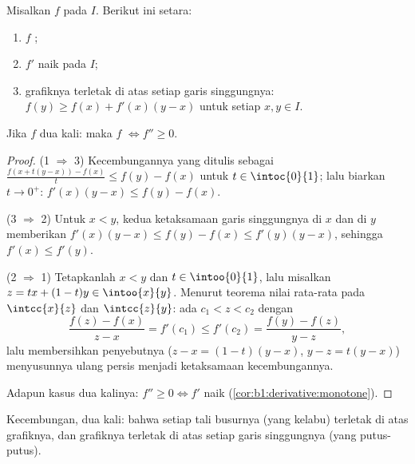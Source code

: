 \begin{theorem}\label{thm:b1:derivative:convexchar}
Misalkan $f$  pada $I$. Berikut ini setara:
\begin{enumerate}
  \item $f$ ;
  \item $f'$ naik pada $I$;
  \item grafiknya terletak di atas setiap garis singgungnya: $f(y) \geq f(x) +
        f'(x)(y - x)$ untuk setiap $x, y \in I$.
\end{enumerate}
Jika $f$  dua kali: maka $f$  $\iff f'' \geq 0$.
\end{theorem}

\begin{proof}
(1 $\Rightarrow$ 3) Kecembungannya yang ditulis sebagai $\frac{f(x + t(y-x)) -
f(x)}{t} \leq f(y) - f(x)$ untuk $t \in \intoc{0}{1}$; lalu biarkan $t \to 0^+$:
$f'(x)(y - x) \leq f(y) - f(x)$.

(3 $\Rightarrow$ 2) Untuk $x < y$, kedua ketaksamaan garis singgungnya di $x$
dan di $y$ memberikan $f'(x)(y-x) \leq f(y) - f(x) \leq f'(y)(y - x)$,
sehingga $f'(x) \leq f'(y)$.

(2 $\Rightarrow$ 1) Tetapkanlah $x < y$ dan $t \in \intoo{0}{1}$, lalu misalkan $z
= tx + (1-t)y \in \intoo{x}{y}$. Menurut teorema nilai rata-rata pada
$\intcc{x}{z}$ dan $\intcc{z}{y}$: ada $c_1 < z < c_2$ dengan
\[
\frac{f(z) - f(x)}{z - x} = f'(c_1) \leq f'(c_2)
= \frac{f(y) - f(z)}{y - z} ,
\]
lalu membersihkan penyebutnya ($z - x = (1-t)(y-x)$, $y - z = t(y-x)$)
menyusunnya ulang persis menjadi ketaksamaan kecembungannya.

Adapun kasus  dua kalinya: $f'' \geq 0 \iff f'$ naik
(\cref{cor:b1:derivative:monotone}).
\end{proof}

\begin{omfigure}

{\small Kecembungan, dua kali: bahwa setiap tali busurnya (yang kelabu) terletak di atas grafiknya,
dan grafiknya terletak di atas setiap garis singgungnya (yang putus-putus).}
\end{omfigure}

